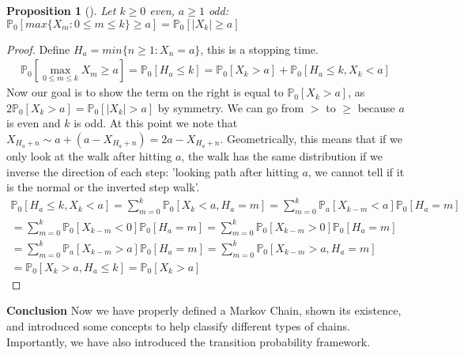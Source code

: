 \documentclass[12pt]{book}
\newtheorem{prop}[theorem]{Proposition}
\theoremstyle{definition}
\theoremstyle{remark}
\begin{document}
\begin{prop}[]
	Let $k\geq 0$ even, $a\geq1$ odd: $\mathbb{P}_{0} \left[ max\{X_m: 0 \leq m \leq k \} \geq a \right] = \mathbb{P}_{0} \left[ |X_k|\geq a \right]  $
\end{prop}
\begin{proof}
	Define $H_a= min\{n \geq 1: X_n =a\}$, this is a stopping time.
	\begin{gather}
		\mathbb{P}_{0} \left[ \max_{0 \leq m \leq k}X_m \geq a \right] = \mathbb{P}_{0} \left[ H_a \leq k \right] = \mathbb{P}_{0} \left[ X_k > a \right]  + \mathbb{P}_{0} \left[ H_a \leq k, X_k < a \right] 
		\end{gather}
		Now our goal is to show the term on the right is equal to $\mathbb{P}_{0} \left[ X_k > a \right] $, as $2\mathbb{P}_{0} \left[ X_k > a \right] = \mathbb{P}_{0} \left[ |X_k| >a \right] $ by symmetry. We can go from $>$ to $\geq$ because $a$ is even and $k$ is odd. At this point we note that $X_{H_a +n} \sim a + (a-X_{H_a +n}) = 2a - X_{H_a +n}$. Geometrically, this means that if we only look at the walk after hitting $a$, the walk has the same distribution if we inverse the direction of each step: 'looking path after hitting $a$, we cannot tell if it is the normal or the inverted step walk'.
	\begin{gather}
		\mathbb{P}_{0} \left[ H_a \leq k, X_k < a \right] = \sum_{m=0}^{k} \mathbb{P}_{0} \left[ X_k < a, H_a = m \right] = \sum_{m=0}^{k} \mathbb{P}_{a} \left[ X_{k-m} < a \right] \mathbb{P}_{0} \left[ H_a = m \right]  \\
		= \sum_{m=0}^{k} \mathbb{P}_{0} \left[ X_{k-m}<0 \right] \mathbb{P}_{0} \left[ H_a = m \right] = \sum_{m=0}^{k} \mathbb{P}_{0} \left[ X_{k-m}>0 \right] \mathbb{P}_{0} \left[ H_a = m \right] \\
		= \sum_{m=0}^{k} \mathbb{P}_{a} \left[ X_{k-m}>a \right] \mathbb{P}_{0} \left[ H_a = m \right] = 
		 \sum_{m=0}^{k} \mathbb{P}_{0} \left[ X_{k-m}>a, H_a =m \right] \\
		= \mathbb{P}_{0} \left[ X_k >a, H_a \leq k \right] = \mathbb{P}_{0} \left[ X_k > a \right]  
	 \end{gather}
	
\end{proof}


\noindent
\textbf{Conclusion} Now we have properly defined a Markov Chain, shown its existence, and introduced some concepts to help classify different types of chains. Importantly, we have also introduced the transition probability framework. 
\end{document}
